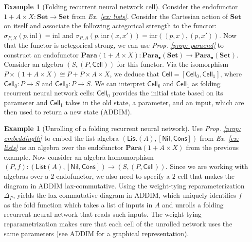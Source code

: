 \documentclass[12pt,a4paper,openright,twoside]{report}
\theoremstyle{plain}
\theoremstyle{definition}
\newtheorem{example}[proposition]{Example}
\begin{document}
\begin{example}[Folding recurrent neural network cell]
  \label{ex: frnncell}
  Consider the endofunctor $1 + A \times X: \mathbf{Set} \to \mathbf{Set}$ from \textit{Ex. \ref{ex: lists}}. Consider the Cartesian action of $\mathbf{Set}$ on itself and associate the following actegorical strength to the functor: $\sigma_{P,X}(p,\mathrm{inl}) = \mathrm{inl}$ and  $\sigma_{P,A}(p,\mathrm{inr}(x,x')) = \mathrm{inr}((p,x), (p,x'))$. Now that the functor is actegorical strong, we can use \textit{Prop. \ref{prop: paraend}} to construct an endofunctor $\mathbf{Para}(1 + A \times X): \mathbf{Para}_{\bullet}(\mathbf{Set}) \to \mathbf{Para}_{\bullet}(\mathbf{Set})$. Consider an algebra $(S,(P,\mathsf{Cell}))$ for this functor. Via the isomorphism $P \times (1 + A \times X) \cong P + P \times A \times X$, we deduce that $\mathsf{Cell} = [\mathsf{Cell}_0, \mathsf{Cell}_1]$, where $\mathsf{Cell}_0: P \to S$ and  $\mathsf{Cell}_0: P \to S$. We can interpret $\mathsf{Cell}_0$ and $\mathsf{Cell}_1$ as folding recurrent neural network cells: $\mathsf{Cell}_0$ provides the initial state based on its parameter and $\mathsf{Cell}_1$ takes in the old state, a parameter, and an input, which are then used to return a new state (ADDIM).
\end{example}

\begin{example}[Unrolling of a folding recurrent neural network]
  \label{ex: frnnunroll}
  Use \textit{Prop. \ref{prop: embeddingth}} to embed the list algebra $(\mathsf{List}(A), [\mathsf{Nil}, \mathsf{Cons}])$ from \textit{Ex. \ref{ex: lists}} as an algebra over the endofunctor $\mathbf{Para}(1 + A \times X)$ from the previous example. Now consider an algebra homomorphism $(P,f): (\mathsf{List}(A), [\mathsf{Nil}, \mathsf{Cons}]) \to (S,(P,\mathsf{Cell}))$. Since we are working with algebras over a $2$-endofunctor, we also need to specify a $2$-cell that makes the diagram in ADDIM lax-commutative. Using the weight-tying reparameterization $\Delta_P$, yields the lax commutative diagram in ADDIM, which uniquely identifies $f$ as the fold function which takes a list of inputs in $A$ and unrolls a folding recurrent neural network that reads such inputs. The weight-tying reparametrization makes sure that each cell of the unrolled network uses the same parameters (see ADDIM for a graphical representation). 
\end{example}
\end{document}

